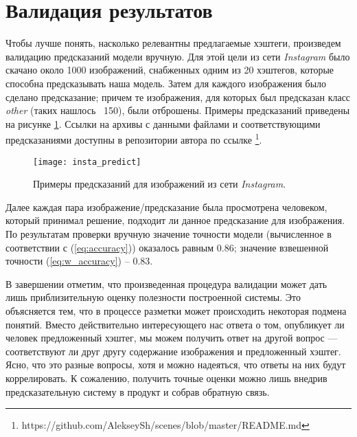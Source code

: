\section{Валидация результатов}


\indent
\indent
Чтобы лучше понять, насколько релевантны предлагаемые хэштеги,
произведем валидацию предсказаний модели вручную. Для этой цели 
из сети \textit{Instagram} было скачано около 1000 изображений, снабженных
одним из 20 хэштегов, которые способна предсказывать наша модель. Затем для 
каждого изображения было сделано предсказание; причем те изображения,
для которых был предсказан класс \textit{other} (таких нашлось ~150),
были отброшены. Примеры предсказаний 
приведены на рисунке \ref{tikzpicture: insta_predict}.
Ссылки на архивы с данными файлами и 
соответствующими предсказаниями доступны в репозитории автора по
ссылке
\footnote{https://github.com/AlekseySh/scenes/blob/master/README.md}.
 

\begin{figure}[h!]
    \begin{center}
   	    \texttt{[image: insta\_predict]}
   	\end{center}
   	\caption{Примеры предсказаний для изображений из сети \textit{Instagram}.}
   	\label{tikzpicture: insta_predict}
\end{figure}


\indent
\indent
Далее каждая пара изображение/предсказание была просмотрена человеком,
который принимал решение, подходит ли данное предсказание для изображения.
По результатам проверки вручную значение точности модели
(вычисленное в соответствии 
с (\ref{eq:accuracy})) оказалось равным 0.86; 
значение взвешенной точности (\ref{eq:w_accuracy}) -- 0.83.



\indent
\indent
В завершении отметим, что произведенная процедура валидации может дать лишь
приблизительную оценку полезности построенной системы. Это объясняется
тем, что в процессе разметки может происходить некоторая подмена понятий.
Вместо действительно интересующего нас ответа о том, опубликует ли человек 
предложенный хэштег, мы можем получить ответ на другой вопрос --- 
соответствуют ли друг другу содержание изображения 
и предложенный хэштег. Ясно, что это разные вопросы, хотя и можно надеяться,
что ответы на них будут коррелировать.
К сожалению, получить точные оценки можно лишь внедрив 
предсказательную систему в продукт и собрав обратную связь.